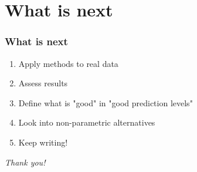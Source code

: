 \documentclass{beamer}
\begin{document}
\section{What is next}
\begin{frame}
	\frametitle{What is next}
	\begin{enumerate}
		\item Apply methods to real data
		\item Assess results
		\item Define what is  "good" in "good prediction levels"
		\item Look into non-parametric alternatives
		\item Keep writing!
	\end{enumerate}
\end{frame}

\begin{frame}{}
	\centering \Huge
	\emph{Thank you!}
\end{frame}
\end{document}
